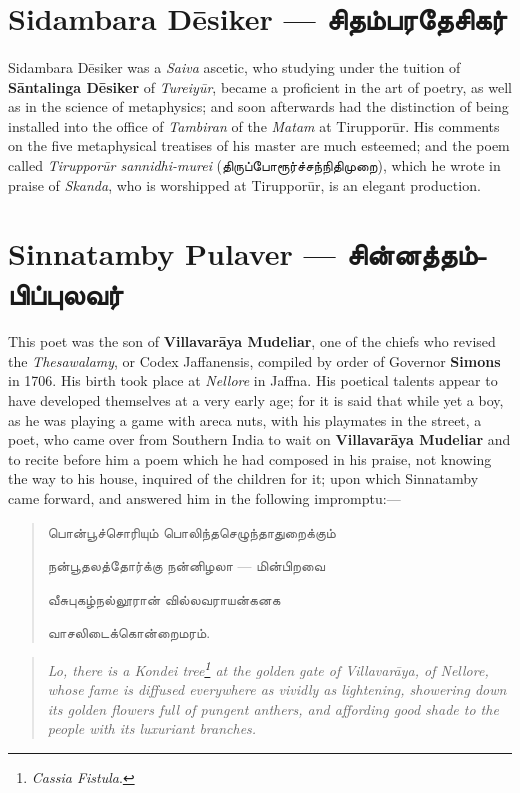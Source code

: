 \documentclass{article}
\newcommand{\TamilText}[1]{\texttamil{#1}}
\newcommand{\TamilBold}[1]{\texttamil{\textbf{#1}}}
\newcommand{\tam}[1]{\TamilText{#1}}
\newcommand{\tambold}[1]{\TamilBold{#1}}
\begin{document}
\section{Sidambara D\={e}siker --- \tambold{சிதம்பரதேசிகர்}}
\paragraph{}
Sidambara D\={e}siker was a \emph{Saiva} ascetic, who studying under the tuition of \textbf{S\={a}ntalinga D\={e}siker} of \emph{Tureiy\={u}r}, became a proficient in the art of poetry, as well as in the science of metaphysics; and soon afterwards had the distinction of being installed into the office of \emph{Tambiran} of the \emph{Matam} at Tiruppor\={u}r. His comments on the five metaphysical treatises of his master are much esteemed; and the poem called \emph{Tiruppor\={u}r sannidhi-murei} (\tam{திருப்போரூர்ச்சந்நிதிமுறை}), which he wrote in praise of \emph{Skanda}, who is worshipped at Tiruppor\={u}r, is an elegant production.

\section{Sinnatamby Pulaver --- \tambold{சின்னத்தம்பிப்புலவர்}}
\paragraph{}
This poet was the son of \textbf{Villavar\={a}ya Mudeliar}, one of the chiefs who revised the \emph{Thesawalamy}, or Codex Jaffanensis, compiled by order of Governor \textbf{Simons} in 1706. His birth took place at \emph{Nellore} in Jaffna. His poetical talents appear to have developed themselves at a very early age; for it is said that while yet a boy, as he was playing a game with areca nuts, with his playmates in the street, a poet, who came over from Southern India to wait on \textbf{Villavar\={a}ya Mudeliar} and to recite before him a poem which he had composed in his praise, not knowing the way to his house, inquired of the children for it; upon which Sinnatamby came forward, and answered him in the following impromptu:---
\begin{quotation}\small
\tam{பொன்பூச்சொரியும்‌ பொலிந்தசெழுந்தாதுறைக்கும்‌}

\tam{நன்பூதலத்தோர்க்கு நன்னிழலா} --- \tam{மின்‌பிறவை}

\tam{வீசுபுகழ்நல்லூரான்‌ வில்லவராயன்கனக}

\tam{வாசலிடைக்கொன்றைமரம்}.
\end{quotation}
\begin{quotation}\small
\emph{Lo, there is a Kondei tree\footnote{\emph{Cassia Fistula}.} at the golden gate of Villavar\={a}ya, of Nellore, whose fame is diffused everywhere as vividly as lightening, showering down its golden flowers full of pungent anthers, and affording good shade to the people with its luxuriant branches.}
\end{quotation}
\end{document}
